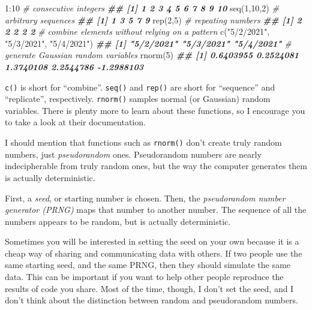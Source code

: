 \documentclass[
  12pt,
  krantz2]{krantz}
\makeatletter
\newenvironment{Shaded}{\begin{snugshade}}{\end{snugshade}}
\newcommand{\CommentTok}[1]{\textcolor[rgb]{0.37,0.37,0.37}{\textit{#1}}}
\newcommand{\DecValTok}[1]{\textcolor[rgb]{0.06,0.06,0.06}{#1}}
\newcommand{\DocumentationTok}[1]{\textcolor[rgb]{0.37,0.37,0.37}{\textbf{\textit{#1}}}}
\newcommand{\FunctionTok}[1]{\textcolor[rgb]{0,0,0}{#1}}
\newcommand{\NormalTok}[1]{#1}
\newcommand{\SpecialCharTok}[1]{\textcolor[rgb]{0,0,0}{#1}}
\newcommand{\StringTok}[1]{\textcolor[rgb]{0.5,0.5,0.5}{#1}}
\newenvironment{kframe}{%
\medskip{}
\setlength{\fboxsep}{.8em}
 \def\at@end@of@kframe{}%
 \ifinner\ifhmode%
  \def\at@end@of@kframe{\end{minipage}}%
  \begin{minipage}{\columnwidth}%
 \fi\fi%
 \def\FrameCommand##1{\hskip\@totalleftmargin \hskip-\fboxsep
 \colorbox{shadecolor}{##1}\hskip-\fboxsep
     \hskip-\linewidth \hskip-\@totalleftmargin \hskip\columnwidth}%
 \MakeFramed {\advance\hsize-\width
   \@totalleftmargin\z@ \linewidth\hsize
   \@setminipage}}%
 {\par\unskip\endMakeFramed%
 \at@end@of@kframe}
\renewenvironment{Shaded}{\begin{kframe}}{\end{kframe}}
\newenvironment{rmd-details}{\begin{lrbox}{\rmdbox}
  \minipage[c]{\dimexpr \textwidth-2\fboxrule-\wd\bulb-\columnsep}
    \vspace*{\columnsep}}%
{\vspace*{\columnsep}\endminipage\end{lrbox}%
  {\par\color{green}\fboxsep=0pt
    \fbox{\usebox\bulb\usebox\rmdbox\hspace{\columnsep}}\par}}
\makeatother
\begin{document}
\begin{Shaded}
\begin{Highlighting}[]
\DecValTok{1}\SpecialCharTok{:}\DecValTok{10}         \CommentTok{\# consecutive integers}
\DocumentationTok{\#\#  [1]  1  2  3  4  5  6  7  8  9 10}
\FunctionTok{seq}\NormalTok{(}\DecValTok{1}\NormalTok{,}\DecValTok{10}\NormalTok{,}\DecValTok{2}\NormalTok{)  }\CommentTok{\# arbitrary sequences}
\DocumentationTok{\#\# [1] 1 3 5 7 9}
\FunctionTok{rep}\NormalTok{(}\DecValTok{2}\NormalTok{,}\DecValTok{5}\NormalTok{)     }\CommentTok{\# repeating numbers}
\DocumentationTok{\#\# [1] 2 2 2 2 2}
\CommentTok{\# combine elements without relying on a pattern}
\FunctionTok{c}\NormalTok{(}\StringTok{"5/2/2021"}\NormalTok{, }\StringTok{"5/3/2021"}\NormalTok{, }\StringTok{"5/4/2021"}\NormalTok{) }
\DocumentationTok{\#\# [1] "5/2/2021" "5/3/2021" "5/4/2021"}
\CommentTok{\# generate Gaussian random variables}
\FunctionTok{rnorm}\NormalTok{(}\DecValTok{5}\NormalTok{)                             }
\DocumentationTok{\#\# [1]  0.6403955  0.2524081  1.3740108  2.2544786 {-}1.2988103}
\end{Highlighting}
\end{Shaded}

\texttt{c()} is short for ``combine''. \texttt{seq()} and \texttt{rep()} are short for ``sequence'' and ``replicate'', respectively. \texttt{rnorm()} samples normal (or Gaussian) random variables. There is plenty more to learn about these functions, so I encourage you to take a look at their documentation.

\begin{rmd-details}
I should mention that functions such as \texttt{rnorm()} don't create truly random numbers, just \emph{pseudorandom} ones. Pseudorandom numbers are nearly indecipherable from truly random ones, but the way the computer generates them is actually deterministic.

First, a \emph{seed}, or starting number is chosen. Then, the \emph{pseudorandom number generator (PRNG)} maps that number to another number. The sequence of all the numbers appears to be random, but is actually deterministic.

Sometimes you will be interested in setting the seed on your own because it is a cheap way of sharing and communicating data with others. If two people use the same starting seed, and the same PRNG, then they should simulate the same data. This can be important if you want to help other people reproduce the results of code you share. Most of the time, though, I don't set the seed, and I don't think about the distinction between random and pseudorandom numbers.

\end{rmd-details}
\end{document}
